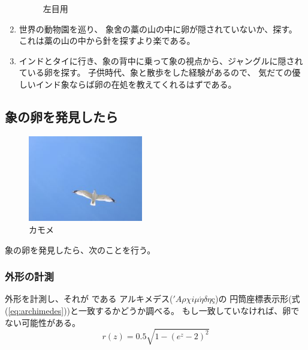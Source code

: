\documentclass[11pt,a4j,dvipdfmx]{jarticle} 					%
\newcommand{\研究課題名}{象の卵}
\newcommand{\研究機関名}{逢坂大学}
\newcommand{\研究代表者氏名}{湯川秀樹}
\begin{document}
\begin{enumerate}
\begin{figure}[h]
\begin{minipage}[t]{0.49\linewidth}
            			\caption{左目用}
            			\label{fig:egg_L}
        			\end{minipage}
                 \end{figure}
                 
	\item 世界の動物園を巡り、
            	象舍の藁の山の中に卵が隠されていないか、探す。
		これは藁の山の中から針を探すより楽である。


	\item インドとタイに行き、象の背中に乗って象の視点から、ジャングルに隠されている卵を探す。
		子供時代、象と散歩をした経験があるので\cite{inTheForest}、
		気だての優しいインド象ならば卵の在処を教えてくれるはずである。
		
\end{enumerate}

\subsection{象の卵を発見したら}
         \begin{figure}
         		\begin{center}
		         \includegraphics[width=5cm]{figs/seagull2.eps}
		         \caption{カモメ}
		         \label{fig:seagull}
	         \end{center}
         \end{figure}
象の卵を発見したら、次のことを行う。
\subsubsection{外形の計測}
        外形を計測し、それが
        である
        アルキメデス(\('A\rho\chi i\mu\acute{\eta}\delta\eta\mbox{\c{c}}\))の
        円筒座標表示形(式(\ref{eq:archimedes}))と一致するかどうか調べる。
        もし一致していなければ、卵でない可能性がある。
        \begin{equation}
        	\label{eq:archimedes}
        	r(z) = 0.5\sqrt{1-(e^z-2)^2}
        \end{equation}
\end{document}
